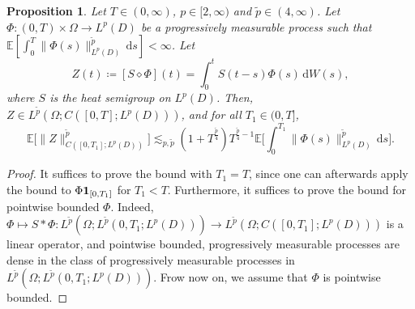 \documentclass{amsart}
\theoremstyle{plain}
\theoremstyle{remark}
\theoremstyle{plain}
\newtheorem{proposition}[theorem]{Proposition}
\numberwithin{equation}{section}
\newcommand{\ceqq}{\coloneqq}
\newcommand{\col}{\colon}
\newcommand{\E}{{\mathbb E}}
\newcommand{\Om}{\Omega}
\newcommand{\dd}{\,\mathrm{d}}
\newcommand{\one}{{{\bf 1}}}
\begin{document}
\begin{proposition}\label{prop:stoch conv}  
Let $T\in(0,\infty)$, $p\in[2,\infty)$ and $\tilde p\in(4,\infty)$. Let $\Phi\col (0,T)\times \Om\to L^p(D)$ be a progressively measurable process such that 
$\E[\int_0^{T}\|\Phi(s)\|_{L^p(D)}^{\tilde p}\dd s]<\infty$. 
Let $$Z(t)\ceqq [S\diamond\Phi](t)= \textstyle{\int_0^t} S(t-s)\Phi(s)\dd W(s),$$ 
where $S$ is the heat semigroup on $L^p(D)$. 
Then, $Z\in L^{\tilde p}(\Om;C([0,T];L^p(D)))$,  and for all $T_1\in(0,T]$,  
\[
\E\big[\|Z\|_{C([0,T_1];L^{p}(D))}^{{\tilde p}}\big]\lesssim_{p,\tilde p}(1+T^{\frac{\tilde p}{4}})T^{\frac{\tilde p}{4}-1}\E\Big[\int_0^{T_1}\|\Phi(s)\|_{L^p(D)}^{\tilde p}\dd s\Big]. 
\] 
\end{proposition}
\begin{proof} 
It suffices to prove the bound with $T_1=T$, since one can afterwards apply the bound to $\Phi\one_{[0,T_1]}$ for $T_1<T$.  
Furthermore, it suffices to prove the bound for pointwise bounded $\Phi$.  Indeed, $\Phi\mapsto S*\Phi\col L^{\tilde p}(\Om ;L^{\tilde p}(0,T_1;L^p(D)))\to L^{\tilde p}(\Om;C([0,T_1];L^{p}(D)))$ is a linear operator, and pointwise bounded, progressively measurable processes are dense in the class of progressively measurable processes in  $L^{\tilde p}(\Om ;L^{\tilde p}(0,T_1;L^p(D)))$. Frow now on, we assume that $\Phi$ is pointwise bounded. 


\end{proof}
\end{document}
